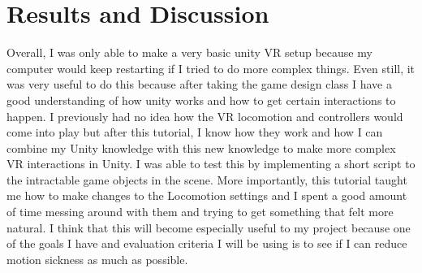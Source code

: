 \documentclass[11pt,twocolumn]{article}
\begin{document}
\section{Results and Discussion}
Overall, I was only able to make a very basic unity VR setup because my computer would keep restarting if I tried to do more complex things. Even still, it was very useful to do this because after taking the game design class I have a good understanding of how unity works and how to get certain interactions to happen. I previously had no idea how the VR locomotion and controllers would come into play but after this tutorial, I know how they work and how I can combine my Unity knowledge with this new knowledge to make more complex VR interactions in Unity. I was able to test this by implementing a short script to the intractable game objects in the scene. More importantly, this tutorial taught me how to make changes to the Locomotion settings and I spent a good amount of time messing around with them and trying to get something that felt more natural. I think that this will become especially useful to my project because one of the goals I have and evaluation criteria I will be using is to see if I can reduce motion sickness as much as possible. 

\printbibliography 
\end{document}
